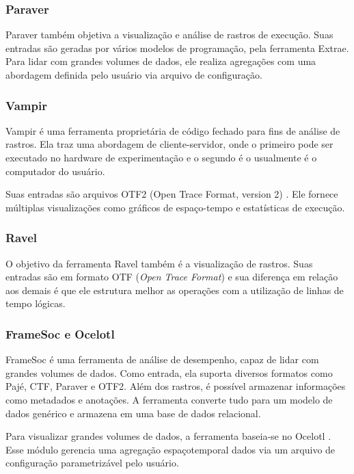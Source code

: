 \subsubsection*{Paraver}
Paraver \cite{ref:paraver} também objetiva a visualização e análise de 
rastros de execução. Suas entradas são geradas por vários modelos de 
programação, pela ferramenta Extrae. Para lidar com grandes volumes de 
dados, ele realiza agregações com uma abordagem definida pelo usuário via 
arquivo de configuração.


\subsubsection*{Vampir}
Vampir \cite{ref:vampir} é uma ferramenta proprietária de código fechado para 
fins de análise de rastros. Ela traz uma abordagem de cliente-servidor, 
onde o primeiro pode ser executado no hardware de experimentação e o segundo é
o usualmente é o computador do usuário.

Suas entradas são arquivos OTF2 (Open Trace Format, version 2) \cite{ref:otf2}.  
Ele fornece múltiplas visualizações como gráficos de espaço-tempo e estatísticas 
de execução.

\subsubsection*{Ravel}
O objetivo da ferramenta Ravel \cite{ref:ravel} também é a visualização de 
rastros. Suas entradas são em formato OTF (\emph{Open Trace Format}) e 
sua diferença em relação aos demais é que ele estrutura melhor as 
operações com a utilização de linhas de tempo lógicas.

\subsubsection*{FrameSoc e Ocelotl}

FrameSoc \cite{ref:framesoc} é uma ferramenta de análise de desempenho, capaz 
de lidar com grandes volumes de dados. Como entrada, ela suporta diversos
formatos como Pajé, CTF, Paraver e OTF2. Além dos rastros, é possível armazenar 
informações como metadados e anotações. A ferramenta converte tudo para um 
modelo de dados genérico e armazena em uma base de dados relacional.

Para visualizar grandes volumes de dados, a ferramenta baseia-se no Ocelotl 
\cite{ref:ocelotl}. Esse módulo gerencia uma agregação espaçotemporal dados via 
um arquivo de configuração parametrizável pelo usuário.

